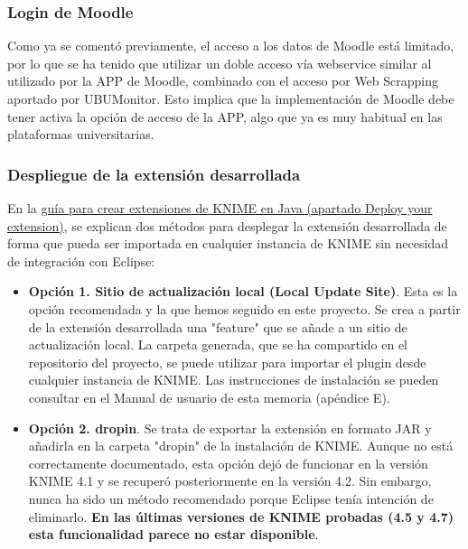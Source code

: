 \subsubsection{Login de Moodle}

Como ya se comentó previamente, el acceso a los datos de Moodle está limitado, por lo que se ha tenido que utilizar 
un doble acceso vía webservice similar al utilizado por la APP de Moodle, combinado con el acceso por Web Scrapping aportado 
por UBUMonitor. Esto implica que la implementación de Moodle debe tener activa la opción de acceso de la APP, algo que ya es muy 
habitual en las plataformas universitarias. 


\subsubsection{Despliegue de la extensión desarrollada}

En la \href{https://docs.knime.com/latest/analytics_platform_new_node_quickstart_guide/index.html#_deploy_your_extension}{guía para crear extensiones de KNIME en Java (apartado Deploy your extension)}, se explican dos métodos para desplegar la extensión 
desarrollada de forma que pueda ser importada en cualquier instancia de KNIME sin necesidad de integración
con Eclipse: 

\begin{itemize}
	\item \textbf{Opción 1. Sitio de actualización local  (Local Update Site)}. Esta es la opción recomendada y la que hemos 
	seguido en este proyecto. Se crea a partir de la extensión
	desarrollada una "feature" que se añade a un sitio de actualización local. La carpeta generada, que se ha compartido 
	en el repositorio del proyecto, se puede utilizar para importar el plugin desde cualquier instancia de KNIME. Las instrucciones de 
	instalación se pueden consultar en el Manual de usuario de esta memoria (apéndice E). 
	\item \textbf{Opción 2. dropin}. Se trata de exportar la extensión en formato JAR y añadirla en la carpeta "dropin" 
	de la instalación de KNIME. Aunque no está correctamente documentado, esta opción dejó de funcionar en la versión KNIME 4.1 y 
	se recuperó posteriormente en la versión 4.2. Sin embargo, nunca ha sido un método recomendado porque Eclipse tenía intención de eliminarlo. 
	\textbf{En las últimas versiones de KNIME probadas (4.5 y 4.7) esta funcionalidad parece no estar disponible}. 
\end{itemize}


